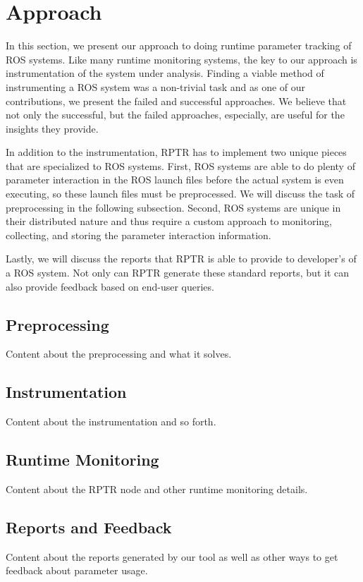 \section{Approach}

In this section, we present our approach to doing runtime parameter tracking of ROS systems. Like many runtime monitoring systems, the key to our approach is instrumentation of the system under analysis. Finding a viable method of instrumenting a ROS system was a non-trivial task and as one of our contributions, we present the failed and successful approaches. We believe that not only the successful, but the failed approaches, especially, are useful for the insights they provide.

In addition to the instrumentation, RPTR has to implement two unique pieces that are specialized to ROS systems. First, ROS systems are able to do plenty of parameter interaction in the ROS launch files before the actual system is even executing, so these launch files must be preprocessed. We will discuss the task of preprocessing in the following subsection. Second, ROS systems are unique in their distributed nature and thus require a custom approach to monitoring, collecting, and storing the parameter interaction information.

Lastly, we will discuss the reports that RPTR is able to provide to developer's of a ROS system. Not only can RPTR generate these standard reports, but it can also provide feedback based on end-user queries.


\subsection{Preprocessing}

Content about the preprocessing and what it solves.


\subsection{Instrumentation}

Content about the instrumentation and so forth.


\subsection{Runtime Monitoring}

Content about the RPTR node and other runtime monitoring details.


\subsection{Reports and Feedback}

Content about the reports generated by our tool as well as other ways to get feedback about parameter usage.
